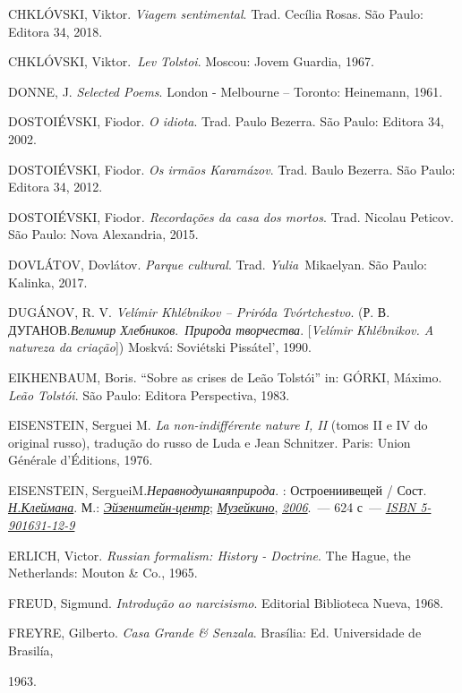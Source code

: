 CHKLÓVSKI, Viktor. \emph{Viagem sentimental}. Trad. Cecília Rosas. São
Paulo: Editora 34, 2018.

CHKLÓVSKI, Viktor.~\emph{Lev Tolstoi}. Moscou: Jovem Guardia, 1967.

DONNE, J. \emph{Selected Poems}. London - Melbourne -- Toronto:
Heinemann, 1961.

DOSTOIÉVSKI, Fiodor. \emph{O idiota}. Trad. Paulo Bezerra. São Paulo:
Editora 34, 2002.

DOSTOIÉVSKI, Fiodor. \emph{Os irmãos Karamázov}. Trad. Baulo Bezerra.
São Paulo: Editora 34, 2012.

DOSTOIÉVSKI, Fiodor\emph{. Recordações da casa dos mortos}. Trad.
Nicolau Peticov. São Paulo: Nova Alexandria, 2015.

DOVLÁTOV, Dovlátov. \emph{Parque cultural}. Trad.
\emph{Yulia}~Mikaelyan. São Paulo: Kalinka, 2017.

DUGÁNOV, R. V. \emph{Velímir Khlébnikov -- Priróda Tvórtchestvo}. (Р. В.
ДУГАНОВ.\emph{Велимир Хлебников}.~\emph{Природа творчества}.
{[}\emph{Velímir Khlébnikov. A natureza da criação}{]}) Moskvá:
Soviétski Pissátel', 1990.

EIKHENBAUM, Boris. ``Sobre as crises de Leão Tolstói'' in: GÓRKI,
Máximo. \emph{Leão Tolstói}. São Paulo: Editora Perspectiva, 1983.

EISENSTEIN, Serguei M. \emph{La non-indifférente nature I, II} (tomos II
e IV do original russo), tradução do russo de Luda e Jean Schnitzer.
Paris: Union Générale d'Éditions, 1976.

EISENSTEIN, SergueiM.\emph{Неравнодушнаяприрода}. : Остроениивещей /
Сост.
\href{https://ru.wikipedia.org/wiki/Клейман,_Наум_Ихильевич}{\emph{\emph{Н.Клеймана}}}.
М.:
\href{https://ru.wikipedia.org/w/index.php?title=Эйзенштейн-центр\&action=edit\&redlink=1}{\emph{Эйзенштейн-центр}};
\href{https://ru.wikipedia.org/wiki/Музей_кино}{\emph{Музейкино}},
\href{https://ru.wikipedia.org/wiki/2006}{\emph{2006}}.~--- 624 с~---
\href{https://ru.wikipedia.org/wiki/Служебная:Источники_книг/5901631129}{\emph{ISBN
5-901631-12-9}}

ERLICH, Victor. \emph{Russian formalism: History - Doctrine}. The Hague,
the Netherlands: Mouton \& Co., 1965.

FREUD, Sigmund. \emph{Introdução ao narcisismo}. Editorial Biblioteca
Nueva, 1968.

FREYRE, Gilberto. \emph{Casa Grande \& Senzala}. Brasília: Ed.
Universidade de Brasilía,

1963.

